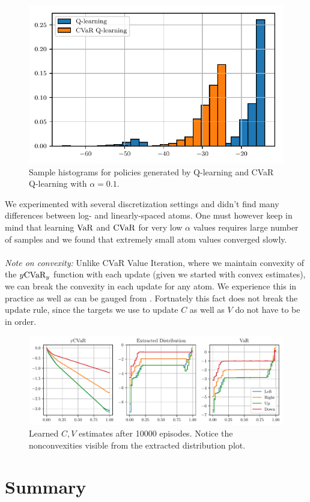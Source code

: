 \begin{figure}[h]
\center
\includegraphics[width=0.6\linewidth]{gfx/sample_hist.pdf}
\caption{Sample histograms for policies generated by Q-learning and CVaR Q-learning with $\alpha=0.1$.}
\label{fig:qhist}
\end{figure}

We experimented with several discretization settings and didn't find many differences between log- and linearly-spaced atoms. One must however keep in mind that learning $\text{VaR}$ and $\text{CVaR}$ for very low $\alpha$ values requires large number of samples and we found that extremely small atom values converged slowly.
\\
\\
\textit{Note on convexity:} Unlike CVaR Value Iteration, where we maintain convexity of the $y\text{CVaR}_y$ function with each update (given we started with convex estimates), we can break the convexity in each update for any atom. We experience this in practice as well as can be gauged from . Fortnately this fact does not break the update rule, since the targets we use to update $C$ as well as $V$ do not have to be in order.


\begin{figure}[h]
\center
\includegraphics[width=\linewidth]{gfx/nonconvex.pdf}
\caption{Learned $C, V$ estimates after 10000 episodes. Notice the nonconvexities visible from the extracted distribution plot.}
\label{fig:nonconvex}
\end{figure}

\section{Summary}



